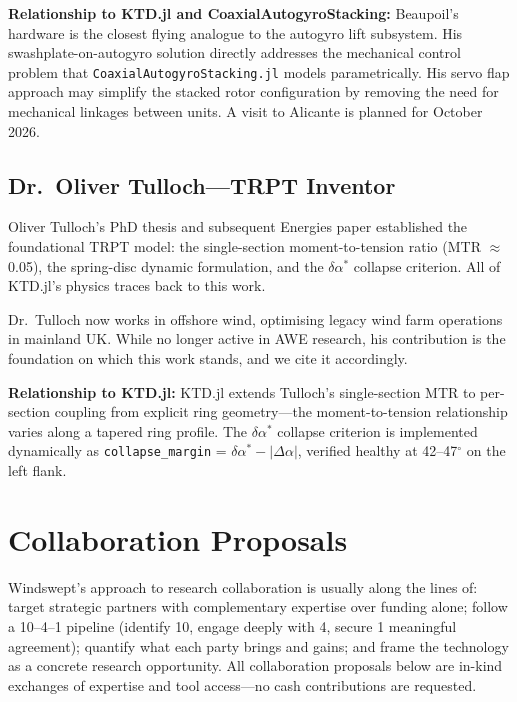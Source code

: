 \documentclass[11pt,a4paper]{article}
\begin{document}
\textbf{Relationship to KTD.jl and CoaxialAutogyroStacking:}
Beaupoil's hardware is the closest flying analogue to the autogyro lift subsystem.
His swashplate-on-autogyro solution directly addresses the mechanical control problem that \texttt{CoaxialAutogyroStacking.jl} models parametrically.
His servo flap approach may simplify the stacked rotor configuration by removing the need for mechanical linkages between units.
A visit to Alicante is planned for October 2026.

\subsection{Dr.\ Oliver Tulloch---TRPT Inventor}

Oliver Tulloch's PhD thesis \cite{tulloch2021} and subsequent Energies paper \cite{tulloch2023} established the foundational TRPT model: the single-section moment-to-tension ratio (MTR $\approx$ 0.05), the spring-disc dynamic formulation, and the $\delta\alpha^*$ collapse criterion.
All of KTD.jl's physics traces back to this work.

Dr.\ Tulloch now works in offshore wind, optimising legacy wind farm operations in mainland UK.
While no longer active in AWE research, his contribution is the foundation on which this work stands, and we cite it accordingly.

\textbf{Relationship to KTD.jl:}
KTD.jl extends Tulloch's single-section MTR to per-section coupling from explicit ring geometry---the moment-to-tension relationship varies along a tapered ring profile.
The $\delta\alpha^*$ collapse criterion is implemented dynamically as \texttt{collapse\_margin} = $\delta\alpha^* - |\Delta\alpha|$, verified healthy at 42--47$^\circ$ on the left flank.

\section{Collaboration Proposals}

Windswept's approach to research collaboration is usually along the lines of: target strategic partners with complementary expertise over funding alone; follow a 10--4--1 pipeline (identify 10, engage deeply with 4, secure 1 meaningful agreement); quantify what each party brings and gains; and frame the technology as a concrete research opportunity.
All collaboration proposals below are in-kind exchanges of expertise and tool access---no cash contributions are requested.
\end{document}
